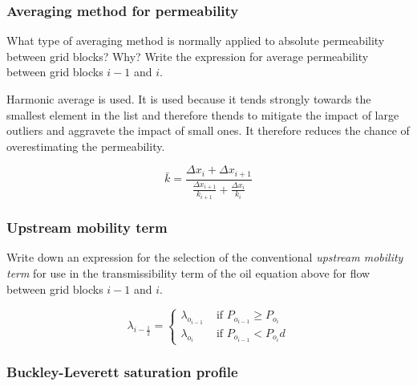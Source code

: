 \subsubsection{Averaging method for permeability} %
\label{ssub:averaging_method}

\begin{question}
  What type of averaging method is normally applied to absolute permeability between grid blocks? Why? Write the expression for average permeability between grid blocks $i-1$ and $i$.
\end{question}

Harmonic average is used. It is used because it tends strongly towards the smallest element in the list and therefore thends to mitigate the impact of large outliers and aggravete the impact of small ones. It therefore reduces the chance of overestimating the permeability.

\begin{equation}
  \bar{k} = \frac{\Delta x_i + \Delta x_{i+1}}{\frac{\Delta x_{i+1}}{k_{i+1}} + \frac{\Delta x_i}{k_i}}
\end{equation}

\subsubsection{Upstream mobility term} %
\label{ssub:upstream_mobility_term}

\begin{question}
  Write down an expression for the selection of the conventional \emph{upstream mobility term} for use in the transmissibility term of the oil equation above for flow between grid blocks $i-1$ and $i$.
\end{question}

\begin{equation}
  \lambda_{i-\frac{1}{2}} =
  \begin{cases}
    \lambda_{o_{i-1}} & \text{ if } P_{o_{i-1}} \geq P_{o_i} \\
    \lambda_{o_i}     & \text{ if } P_{o_{i-1}} < P_{o_i} d
  \end{cases}
\end{equation}

\subsubsection{Buckley-Leverett saturation profile} %
\label{ssub:buckley_leverett_saturation_profile}

